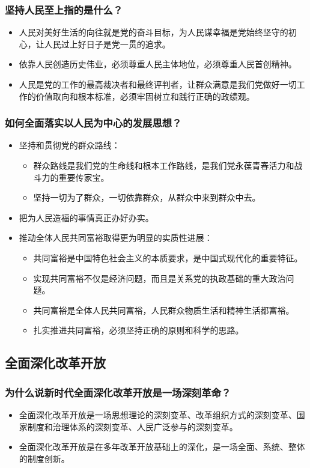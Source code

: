\documentclass{article}
\begin{document}
\subsubsection{坚持人民至上指的是什么？}
\begin{itemize}
    \item 人民对美好生活的向往就是党的奋斗目标，为人民谋幸福是党始终坚守的初心，让人民过上好日子是党一贯的追求。
    \item 依靠人民创造历史伟业，必须尊重人民主体地位，必须尊重人民首创精神。
    \item 人民是党的工作的最高裁决者和最终评判者，让群众满意是我们党做好一切工作的价值取向和根本标准，必须牢固树立和践行正确的政绩观。
\end{itemize}

\subsubsection{如何全面落实以人民为中心的发展思想？}
\begin{itemize}
    \item 坚持和贯彻党的群众路线：
    \begin{itemize}
        \item 群众路线是我们党的生命线和根本工作路线，是我们党永葆青春活力和战斗力的重要传家宝。
        \item 坚持一切为了群众，一切依靠群众，从群众中来到群众中去。
    \end{itemize}
    \item 把为人民造福的事情真正办好办实。
    \item 推动全体人民共同富裕取得更为明显的实质性进展：
    \begin{itemize}
        \item 共同富裕是中国特色社会主义的本质要求，是中国式现代化的重要特征。
        \item 实现共同富裕不仅是经济问题，而且是关系党的执政基础的重大政治问题。
        \item 共同富裕是全体人民共同富裕，人民群众物质生活和精神生活都富裕。
        \item 扎实推进共同富裕，必须坚持正确的原则和科学的思路。
    \end{itemize}
\end{itemize}

\subsection{全面深化改革开放}

\subsubsection{为什么说新时代全面深化改革开放是一场深刻革命？}
\begin{itemize}
    \item 全面深化改革开放是一场思想理论的深刻变革、改革组织方式的深刻变革、国家制度和治理体系的深刻变革、人民广泛参与的深刻变革。
    \item 全面深化改革开放是在多年改革开放基础上的深化，是一场全面、系统、整体的制度创新。
\end{itemize}
\end{document}
